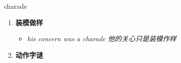 
\begin{frame}
{\huge charade}
\begin{center}
\begin{enumerate}\Large
  \item \textbf{装模做样}
  \begin{itemize}
    \item \em{\Large{his concern was a charade 他的关心只是装模作样}}
  \end{itemize}
  \item \textbf{动作字谜}
\end{enumerate}
\end{center}
\end{frame}
